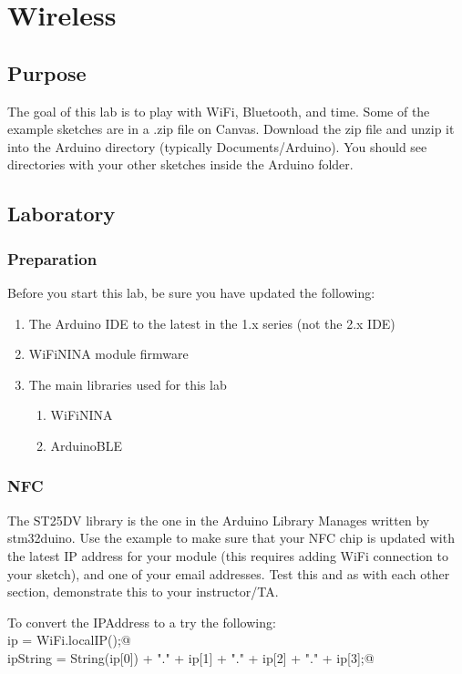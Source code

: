 \chapter{Wireless}

\section{Purpose}
The goal of this lab is to play with WiFi, Bluetooth, and time. Some of the example
sketches are in a .zip file on Canvas. Download the zip file and unzip it into the 
Arduino directory (typically Documents/Arduino). You should see directories with 
your other sketches inside the Arduino folder.

\section{Laboratory}
\subsection{Preparation}
Before you start this lab, be sure you have updated the following:
\begin{enumerate}
    \item The Arduino IDE to the latest in the 1.x series (not the 2.x IDE)
    \item WiFiNINA module firmware
    \item The main libraries used for this lab 
    \begin{enumerate}
        \item WiFiNINA
        \item ArduinoBLE
    \end{enumerate}
\end{enumerate}

\subsection{NFC}
The ST25DV library is the one in the Arduino Library Manages written by stm32duino.
Use the example to make sure that your NFC chip is updated with the latest
IP address for your module (this requires adding WiFi connection to your sketch), 
and one of your email addresses. Test this and as with each other section, 
demonstrate this to your instructor/TA.

To convert the IPAddress to a \lstinline@String@ try the following:\\
\lstinline@IPAddress ip = WiFi.localIP();@\\
\lstinline@String ipString = String(ip[0]) + "." + ip[1] + "." + ip[2] + "." + ip[3];@

